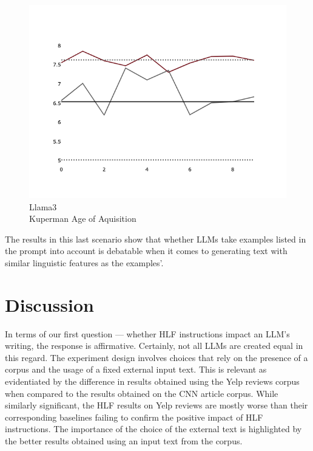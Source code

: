 \documentclass[11pt]{article}
\begin{document}
\begin{figure}[ht]
\begin{minipage}{0.32\textwidth}
        \label{fig-p2-ifd-gemini-twords}
    \end{minipage}
    \hfill
    \begin{minipage}{0.32\textwidth}
        \includegraphics[width=\linewidth]{plots/prompt_2_ifd/prompt_2-llama3_70b-cnn_dailymail/prompt_2-llama3_70b-cnn_dailymail_a_kup_pw.png}
        \caption[center]{Llama3\\Kuperman Age of Aquisition}
        \label{fig-p2-ifd-llama3-a-kup-pw}
    \end{minipage}
\end{figure}

The results in this last scenario show that whether LLMs take examples listed in
the prompt into account is debatable when it comes to generating text with
similar linguistic features as the examples'.

\section{Discussion}

In terms of our first question --- whether HLF instructions impact an LLM's
writing, the response is affirmative.
Certainly, not all LLMs are created equal in this regard.
The experiment design involves choices that rely on the presence of a corpus and
the usage of a fixed external input text.
This is relevant as evidentiated by the difference in results obtained using the
Yelp reviews corpus when compared to the results obtained on the CNN article
corpus.
While similarly significant, the HLF results on Yelp reviews are mostly worse
than their corresponding baselines failing to confirm the positive impact of HLF
instructions.
The importance of the choice of the external text is highlighted by the better
results obtained using an input text from the corpus.
\end{document}
